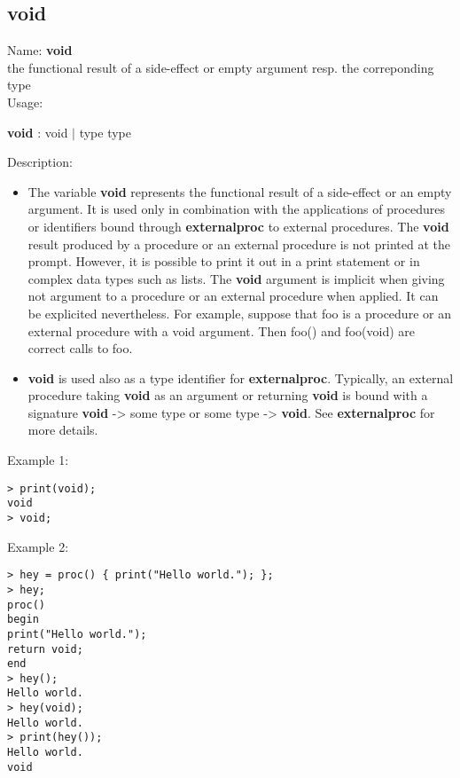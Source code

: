 \subsection{ void }
\noindent Name: \textbf{void}\\
the functional result of a side-effect or empty argument resp. the correponding type\\

\noindent Usage: 
\begin{center}
\textbf{void} : \textsf{void} $|$ \textsf{type type}\\
\end{center}
\noindent Description: \begin{itemize}

\item The variable \textbf{void} represents the functional result of a
   side-effect or an empty argument.  It is used only in combination with
   the applications of procedures or identifiers bound through
   \textbf{externalproc} to external procedures.
   The \textbf{void} result produced by a procedure or an external procedure
   is not printed at the prompt. However, it is possible to print it out
   in a print statement or in complex data types such as lists.
   The \textbf{void} argument is implicit when giving not argument to a
   procedure or an external procedure when applied. It can be explicited
   nevertheless.  For example, suppose that foo is a procedure or an
   external procedure with a void argument. Then foo() and foo(void) are
   correct calls to foo.

\item \textbf{void} is used also as a type identifier for
   \textbf{externalproc}. Typically, an external procedure taking \textbf{void} as an
   argument or returning \textbf{void} is bound with a signature \textbf{void} ->
   some type or some type -> \textbf{void}.  See \textbf{externalproc} for more
   details.
\end{itemize}
\noindent Example 1: 
\begin{center}\begin{minipage}{15cm}\begin{Verbatim}[frame=single]
> print(void);
void
> void;
\end{Verbatim}
\end{minipage}\end{center}
\noindent Example 2: 
\begin{center}\begin{minipage}{15cm}\begin{Verbatim}[frame=single]
> hey = proc() { print("Hello world."); };
> hey;
proc()
begin
print("Hello world.");
return void;
end
> hey();
Hello world.
> hey(void);
Hello world.
> print(hey());
Hello world.
void
\end{Verbatim}
\end{minipage}\end{center}
